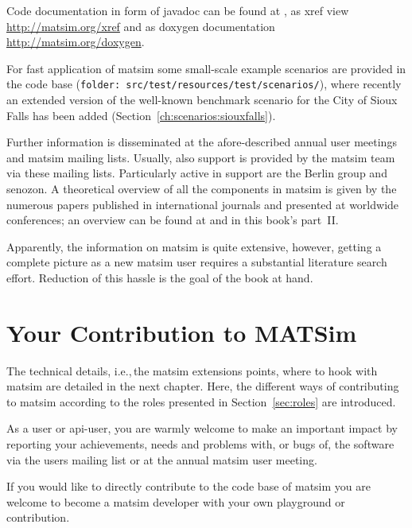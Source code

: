 Code documentation in form of \gls{javadoc} can be found at \citet[][]{MATSIM-Javadoc_Webpage_2015}, as \gls{xref} view \url{http://matsim.org/xref} and as doxygen documentation \url{http://matsim.org/doxygen}. %

For fast application of \gls{matsim} some small-scale example scenarios are provided in the code base (\lstinline|folder: src/test/resources/test/scenarios/|), where recently an extended version of the well-known benchmark scenario for the City of Sioux Falls has been added \citep[][]{ChakirovFourie_TechRep_FCL_2014} (Section~\ref{ch:scenarios:siouxfalls}).

Further information is disseminated at the afore-described annual user meetings and \gls{matsim} mailing lists. Usually, also support is provided by the \gls{matsim} team via these mailing lists. Particularly active in support are the Berlin group and \gls{senozon}. A theoretical overview of all the components in \gls{matsim} is given by the numerous papers published in international journals and presented at worldwide conferences; an overview can be found at \citep[][]{MATSIM-Publications_Webpage_2015} and in this book's part~II.

Apparently, the information on \gls{matsim} is quite extensive, however, getting a complete picture as a new \gls{matsim} user requires a substantial literature search effort. Reduction of this hassle is the goal of the book at hand.

\section{Your Contribution to MATSim}
\label{sec:yourcontribution}
The technical details, i.e.,\,the \gls{matsim} extensions points, where to hook with \gls{matsim} are detailed in the next chapter. Here, the different ways of contributing to \gls{matsim} according to the roles presented in Section~\ref{sec:roles} are introduced.

As a user or \gls{api}-user, you are warmly welcome to make an important impact by reporting your achievements, needs and problems with, or bugs of, the software via the users mailing list or at the annual \gls{matsim} user meeting. 

If you would like to directly contribute to the code base of \gls{matsim} you are welcome to become a \gls{matsim} developer with your own playground or \gls{contribution}.

